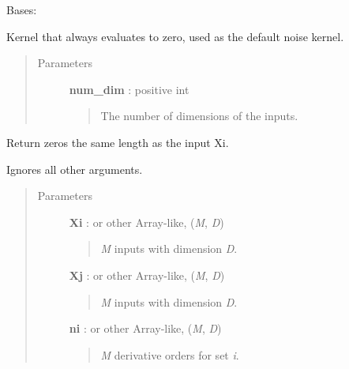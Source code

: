 \documentclass[letterpaper,10pt,english]{sphinxmanual}
\begin{document}
\begin{fulllineitems}
\label{gptools.kernel:gptools.kernel.noise.ZeroKernel}
Bases: {\hyperref[gptools.kernel:gptools.kernel.noise.DiagonalNoiseKernel]{}}

Kernel that always evaluates to zero, used as the default noise kernel.
\begin{quote}\begin{description}
\item[{Parameters}] \leavevmode
\textbf{num\_dim} : positive int
\begin{quote}

The number of dimensions of the inputs.
\end{quote}

\end{description}\end{quote}

\begin{fulllineitems}
\label{gptools.kernel:gptools.kernel.noise.ZeroKernel.__call__}
Return zeros the same length as the input Xi.

Ignores all other arguments.
\begin{quote}\begin{description}
\item[{Parameters}] \leavevmode
\textbf{Xi} :  or other Array-like, (\emph{M}, \emph{D})
\begin{quote}

\emph{M} inputs with dimension \emph{D}.
\end{quote}

\textbf{Xj} :  or other Array-like, (\emph{M}, \emph{D})
\begin{quote}

\emph{M} inputs with dimension \emph{D}.
\end{quote}

\textbf{ni} :  or other Array-like, (\emph{M}, \emph{D})
\begin{quote}

\emph{M} derivative orders for set \emph{i}.
\end{quote}


\end{description}
\end{quote}
\end{fulllineitems}
\end{fulllineitems}
\end{document}
